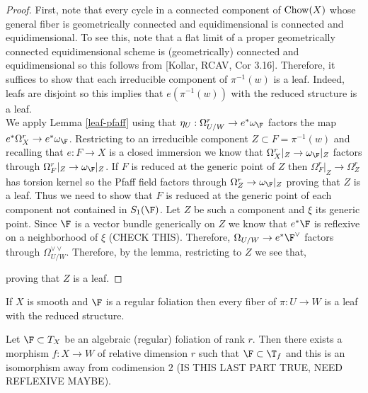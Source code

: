 \documentclass[12pt]{article}
\begin{document}
\begin{proof}
First, note that every cycle in a connected component of $\mathrm{Chow}(X)$ whose general fiber is geometrically connected and equidimensional is connected and equidimensional. To see this, note that a flat limit of a proper geometrically connected equidimensional scheme is (geometrically) connected and equidimensional so this follows from [Kollar, RCAV, Cor 3.16]. Therefore, it suffices to show that each irreducible component of $\pi^{-1}(w)$ is a leaf. Indeed, leafs are disjoint so this implies that $e(\pi^{-1}(w))$ with the reduced structure is a leaf.
\bigskip\\
We apply Lemma \ref{leaf-pfaff} using that $\eta_U : \Omega_{U/W}^r \to e^* \omega_{\F}$ factors the map $e^* \Omega_X^r \to e^* \omega_{\F}$. Restricting to an irreducible component $Z \subset F = \pi^{-1}(w)$ and recalling that $e : F \to X$ is a closed immersion we know that $\Omega_{X}^r|_Z \to \omega_\F |_Z$ factors through $\Omega^r_{F}|_Z \to \omega_\F|_Z$. If $F$ is reduced at the generic point of $Z$ then $\Omega^r_{F}|_Z \to \Omega^r_Z$ has torsion kernel so the Pfaff field factors through $\Omega^r_Z \to \omega_\F|_Z$ proving that $Z$ is a leaf. Thus we need to show that $F$ is reduced at the generic point of each component not contained in $S_1(\F)$. Let $Z$ be such a component and $\xi$ its generic point. Since $\F$ is a vector bundle generically on $Z$ we know that $e^* \F$ is reflexive on a neighborhood of $\xi$ (CHECK THIS). Therefore, $\Omega_{U/W} \to e^* \F^\vee$ factors through $\Omega_{U/W}^{\vee \vee}$. Therefore, by the lemma, restricting to $Z$ we see that,
\begin{center}
\end{center}
proving that $Z$ is a leaf.
\end{proof}

\begin{cor}
If $X$ is smooth and $\F$ is a regular foliation then every fiber of $\pi : U \to W$ is a leaf with the reduced structure. 
\end{cor}

\begin{theorem}
Let $\F \subset T_X$ be an algebraic (regular) foliation of rank $r$. Then there exists a morphism $f : X \to W$ of relative dimension $r$ such that $\F \subset \T_f$ and this is an isomorphism away from codimension $2$ (IS THIS LAST PART TRUE, NEED REFLEXIVE MAYBE).
\end{theorem}
\end{document}
